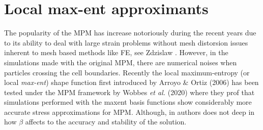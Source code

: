 \begin{algorithm}
\end{algorithm} 

\section{Local max-ent approximants}
\label{sec:local-max-ent}


The popularity of the MPM has increase notoriously during
the recent years due to its ability to deal with large strain problems
without mesh distorsion issues inherent to mesh based methods like
FE, see Zdzislaw \cite{Wieckowski2004}. However, in the simulations made with the original MPM, there are
numerical noises when particles crossing the cell boundaries. Recently
the local maximum-entropy (or local \textit{max-ent}) shape function
first introduced by Arroyo \& Ortiz (2006)\cite{Arroyo2006} has been
tested under the MPM framework by Wobbes {\it et al.} (2020)\cite{Wobbes2020} where they prof that
simulations performed with the maxent basis functions show
considerably more accurate stress approximations for MPM. Although, in
\cite{Wobbes2020} authors does not deep in how $\beta$ affects to the
accuracy and stability of the solution.


